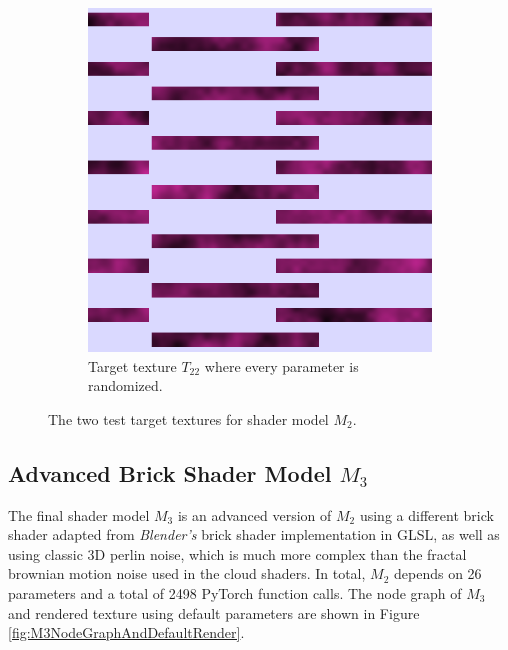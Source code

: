 \begin{figure}[!h]
\begin{subfigure}[t]{.25\textwidth}
    \includegraphics[width=\linewidth]{img/evaluation/simple_brick_random_target.png}
    \caption{Target texture $T_ {22}$ where every parameter is randomized.}
    \label{fig:TargetM2Random}
\end{subfigure}
\caption{The two test target textures for shader model $M_2$.}
\label{fig:TargetsM2}
\end{figure}


\subsection{Advanced Brick Shader Model $M_3$}
The final shader model $M_3$ is an advanced version of $M_2$ using a different brick shader adapted from \textit{Blender's} brick shader implementation in GLSL, as well as using classic 3D perlin noise, which is much more complex than the fractal brownian motion noise used in the cloud shaders. In total, $M_2$ depends on 26 parameters and a total of 2498 PyTorch function calls. The node graph of $M_3$ and rendered texture using default parameters are shown in Figure \ref{fig:M3NodeGraphAndDefaultRender}.

